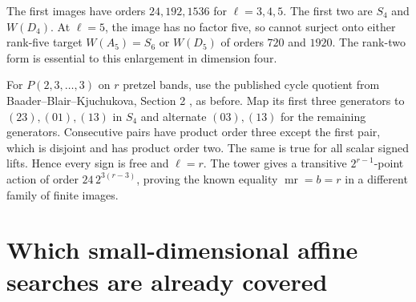 \documentclass[11pt]{article}
\newcommand{\mr}{\operatorname{mr}}
\begin{document}
The first images have orders $24,192,1536$ for $\ell=3,4,5$.
The first two are $S_4$ and $W(D_4)$. At $\ell=5$, the image has no
factor five, so cannot surject onto either rank-five target
$W(A_5)=S_6$ or $W(D_5)$ of orders $720$ and $1920$.
The rank-two form is essential to this enlargement in dimension four.

For $P(2,3,\ldots,3)$ on $r$ pretzel bands, use the published cycle
quotient from Baader--Blair--Kjuchukova, Section 2 \cite{bbk}, as before.
Map its first three generators to $(23),(01),(13)$ in $S_4$ and
alternate $(03),(13)$ for the remaining generators. Consecutive pairs
have product order three except the first pair, which is disjoint and
has product order two. The same is true for all scalar signed lifts.
Hence every sign is free and $\ell=r$. The tower gives a transitive
$2^{r-1}$-point action of order $24\,2^{3(r-3)}$, proving the known
equality $\mr=b=r$ in a different family of finite images.

\section{Which small-dimensional affine searches are already covered}
\end{document}
